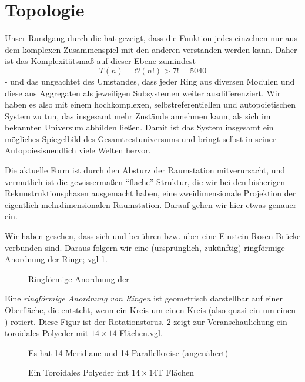 \section*{Topologie}\label{sec:fazit}
\fancyhead[LO]{}

Unser Rundgang durch die  hat gezeigt, dass die Funktion jedes einzelnen  nur aus dem komplexen Zusammenspiel mit den anderen  verstanden werden kann. Daher ist das Komplexitätsmaß auf dieser Ebene zumindest
\begin{equation}
    T(n) = \mathcal{O} (n!) > 7! = 5040
\end{equation}
- und das ungeachtet des Umstandes, dass jeder Ring aus diversen Modulen und diese aus Aggregaten als jeweiligen Subsystemen weiter ausdifferenziert. Wir haben es also mit einem hochkomplexen, selbstreferentiellen und autopoietischen System zu tun, das insgesamt mehr Zustände annehmen kann, als sich im bekannten Universum abbilden ließen. Damit ist das System insgesamt ein mögliches Spiegelbild des Gesamtrestuniversums und bringt selbst in seiner Autopoiesisnendlich viele Welten hervor.


Die aktuelle Form ist durch den Absturz der Raumstation mitverursacht, und vermutlich ist die gewissermaßen "`flache"' Struktur, die wir bei den bisherigen Rekunstruktionsphasen ausgemacht haben, eine zweidimensionale Projektion der eigentlich mehrdimensionalen Raumstation. Darauf gehen wir hier etwas genauer ein.

Wir haben gesehen, dass sich  und  berühren bzw. über eine Einstein-Rosen-Brücke verbunden sind. Daraus folgern wir eine (ursprünglich, zukünftig) ringförmige Anordnung der Ringe; vgl  \cref{fig:ringring}.

\begin{figure}[ht!]
    \centering
    
    \caption{Ringförmige Anordnung der }
    \label{fig:ringring}
\end{figure}

Eine \emph{ringförmige Anordnung von Ringen }ist geometrisch darstellbar auf einer Oberfläche, die entsteht, wenn ein Kreis um einen Kreis (also quasi ein  um einen ) rotiert. Diese Figur ist der Rotationstorus. \cref{fig:torusweiss}  zeigt zur Veranschaulichung ein toroidales Polyeder mit $14\times 14$ Flächen.vgl. 

\begin{figure}[ht!]
    \centering
    
    \caption{Ein Toroidales Polyeder imt $14\times 14$T Flächen} Es hat 14  Meridiane und 14 Parallelkreise (angenähert)
    \label{fig:torusweiss}
\end{figure}

